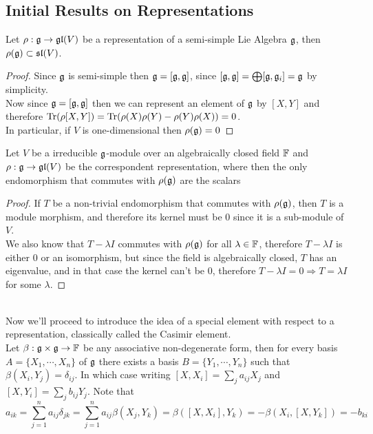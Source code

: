 \subsection*{Initial Results on Representations}
\begin{lema}
	Let $\rho:\mathfrak{g}\rightarrow \mathfrak{gl}(V)$ be a representation of a semi-simple Lie Algebra $\mathfrak{g}$, then $\rho(\mathfrak{g})\subset \mathfrak{sl}(V)$.
	\label{trace0lemma}
\end{lema}
\begin{proof}
	Since $\mathfrak{g}$ is semi-simple then $\mathfrak{g}=[\mathfrak{g},\mathfrak{g}]$, since $[\mathfrak{g},\mathfrak{g}] = \bigoplus [\mathfrak{g},\mathfrak{g}_i] = \mathfrak{g}$ by simplicity.\\ 
	Now since $\mathfrak{g}=[\mathfrak{g},\mathfrak{g}]$ then we can represent an element of $\mathfrak{g}$ by $[X,Y]$ and therefore $\text{Tr}(\rho[X,Y]) = \text{Tr}(\rho(X)\rho(Y)-\rho(Y)\rho(X))=0$.\\
	In particular, if $V$ is one-dimensional then $\rho(\mathfrak{g}) = 0$
\end{proof}
\begin{lema}
	Let $V$ be a irreducible $\mathfrak{g}$-module over an algebraically closed field $\mathbb{F}$ and $\rho:\mathfrak{g} \rightarrow \mathfrak{gl}(V)$ be the correspondent representation, where  then the only endomorphism that commutes with $\rho(\mathfrak{g})$ are the scalars
	\label{Schur's Lemma}
\end{lema}
\begin{proof}
	If $T$ be a non-trivial endomorphism that commutes with $\rho(\mathfrak{g})$, then $T$ is a module morphism, and therefore its kernel must be $0$ since it is a sub-module of $V$.\\
	We also know that $T - \lambda I$ commutes with $\rho(\mathfrak{g})$ for all $\lambda \in \mathbb{F}$, therefore $T-\lambda I$ is either $0$ or an isomorphism, but since the field is algebraically closed, $T$ has an eigenvalue, and in that case the kernel can't be $0$, therefore $T-\lambda I = 0 \Rightarrow T=\lambda I$ for some $\lambda$.
\end{proof}\\
Now we'll proceed to introduce the idea of a special element with respect to a representation, classically called the Casimir element.\\
Let $\beta:\mathfrak{g} \times \mathfrak{g} \rightarrow \mathbb{F}$ be any associative non-degenerate form, then for every basis $A=\{X_1,\cdots,X_n\}$ of $\mathfrak{g}$ there exists a basis $B=\{Y_1,\cdots,Y_n\}$ such that $\beta(X_i,Y_j)=\delta_{ij}$. In which case writing $[X,X_i] = \sum_j a_{ij} X_j$ and $[X,Y_i]=\sum_j b_{ij} Y_j$. Note that
$$a_{ik} = \sum_{j=1}^n a_{ij}\delta_{jk} = \sum_{j=1}^n a_{ij} \beta(X_j,Y_k) =\beta([X,X_i],Y_k) = -\beta (X_i,[X,Y_k]) = -b_{ki} $$
